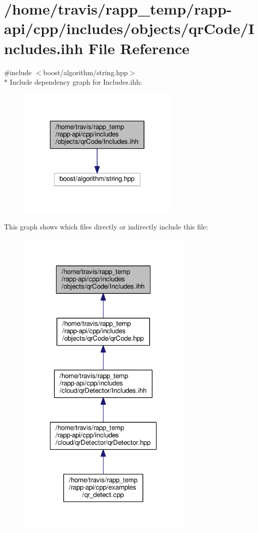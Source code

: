 \hypertarget{objects_2qrCode_2Includes_8ihh}{\section{/home/travis/rapp\-\_\-temp/rapp-\/api/cpp/includes/objects/qr\-Code/\-Includes.ihh File Reference}
\label{objects_2qrCode_2Includes_8ihh}
}
{\ttfamily \#include $<$boost/algorithm/string.\-hpp$>$}\\*
Include dependency graph for Includes.\-ihh\-:
\nopagebreak
\begin{figure}[H]
\begin{center}
\leavevmode
\includegraphics[width=220pt]{objects_2qrCode_2Includes_8ihh__incl}
\end{center}
\end{figure}
This graph shows which files directly or indirectly include this file\-:
\nopagebreak
\begin{figure}[H]
\begin{center}
\leavevmode
\includegraphics[width=238pt]{objects_2qrCode_2Includes_8ihh__dep__incl}
\end{center}
\end{figure}
